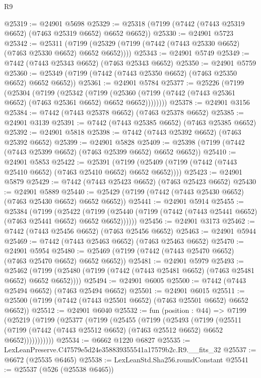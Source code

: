 \begin{lexlean}{R9}
\begin{coremodule}
@25319 := @24901 @5698
@25329 := @25318 (@7199 (@7442 (@7443 @25319 @6652) (@7463 @25319 @6652) @6652 @6652))
@25330 := @24901 @5723
@25342 := @25311
    (@7199 (@25329 (@7199 (@7442 (@7443 @25330 @6652) (@7463 @25330 @6652) @6652 @6652))))
@25343 := @24901 @5749
@25349 := @7442 (@7443 @25343 @6652) (@7463 @25343 @6652)
@25350 := @24901 @5759
@25360 := @25349 (@7199 (@7442 (@7443 @25350 @6652) (@7463 @25350 @6652) @6652 @6652))
@25361 := @24901 @5784
@25377 := @25226
    (@7199
      (@25304
        (@7199
          (@25342
            (@7199
              (@25360 (@7199 (@7442 (@7443 @25361 @6652) (@7463 @25361 @6652) @6652 @6652))))))))
@25378 := @24901 @3156
@25384 := @7442 (@7443 @25378 @6652) (@7463 @25378 @6652)
@25385 := @24901 @3139
@25391 := @7442 (@7443 @25385 @6652) (@7463 @25385 @6652)
@25392 := @24901 @5818
@25398 := @7442 (@7443 @25392 @6652) (@7463 @25392 @6652)
@25399 := @24901 @5828
@25409 := @25398 (@7199 (@7442 (@7443 @25399 @6652) (@7463 @25399 @6652) @6652 @6652))
@25410 := @24901 @5853
@25422 := @25391
    (@7199 (@25409 (@7199 (@7442 (@7443 @25410 @6652) (@7463 @25410 @6652) @6652 @6652))))
@25423 := @24901 @5879
@25429 := @7442 (@7443 @25423 @6652) (@7463 @25423 @6652)
@25430 := @24901 @5889
@25440 := @25429 (@7199 (@7442 (@7443 @25430 @6652) (@7463 @25430 @6652) @6652 @6652))
@25441 := @24901 @5914
@25455 := @25384
    (@7199
      (@25422
        (@7199 (@25440 (@7199 (@7442 (@7443 @25441 @6652) (@7463 @25441 @6652) @6652 @6652))))))
@25456 := @24901 @3173
@25462 := @7442 (@7443 @25456 @6652) (@7463 @25456 @6652)
@25463 := @24901 @5944
@25469 := @7442 (@7443 @25463 @6652) (@7463 @25463 @6652)
@25470 := @24901 @5954
@25480 := @25469 (@7199 (@7442 (@7443 @25470 @6652) (@7463 @25470 @6652) @6652 @6652))
@25481 := @24901 @5979
@25493 := @25462
    (@7199 (@25480 (@7199 (@7442 (@7443 @25481 @6652) (@7463 @25481 @6652) @6652 @6652))))
@25494 := @24901 @6005
@25500 := @7442 (@7443 @25494 @6652) (@7463 @25494 @6652)
@25501 := @24901 @6015
@25511 := @25500 (@7199 (@7442 (@7443 @25501 @6652) (@7463 @25501 @6652) @6652 @6652))
@25512 := @24901 @6040
@25532 := fun (position : @44) =>
  @7199
    (@25219
      (@7199
        (@25377
          (@7199
            (@25455
              (@7199
                (@25493
                  (@7199
                    (@25511
                      (@7199 (@7442 (@7443 @25512 @6652) (@7463 @25512 @6652) @6652 @6652)))))))))))
@25534 := @6662 @1220 @6827
@25535 := LexLeanPreserve.C47579e5d24e358839355541a17579b2c.R9.__fits_32
@25537 := @6672 (@25535 @6465)
@25538 := LexLeanStd.Sha256.roundConstant
@25541 := @25537 (@526 (@25538 @6465))

\end{coremodule}
\end{lexlean}
